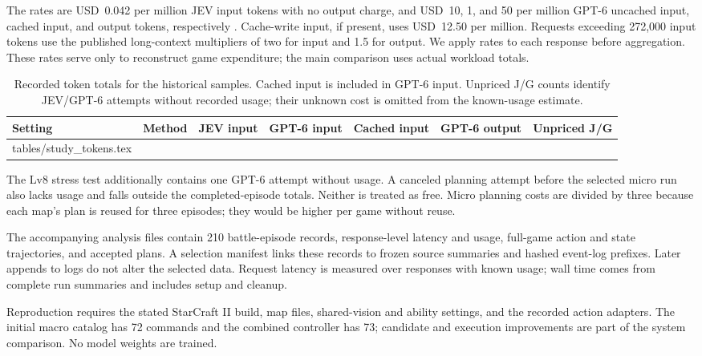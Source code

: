\documentclass{article}
\makeatletter
\newcommand{\tablerows}[1]{\@@input #1 }
\newcommand{\captionbelowtable}{\normalsize\setlength{\abovecaptionskip}{7pt}\setlength{\belowcaptionskip}{0pt}}
\makeatother
\begin{document}
The rates are USD~0.042 per million JEV input tokens with no output charge, and USD~10, 1, and 50 per million GPT-6 uncached input, cached input, and output tokens, respectively \citep{typesafe2026models,openai2026gpt6astra}. Cache-write input, if present, uses USD~12.50 per million. Requests exceeding 272,000 input tokens use the published long-context multipliers of two for input and 1.5 for output. We apply rates to each response before aggregation. These rates serve only to reconstruct game expenditure; the main comparison uses actual workload totals.

\begin{table}[h]
\centering\scriptsize
\setlength{\tabcolsep}{3.5pt}
\begin{tabular}{llrrrrr}
\toprule
Setting & Method & JEV input & GPT-6 input & Cached input & GPT-6 output & Unpriced J/G \\
\midrule
\tablerows{tables/study_tokens.tex}
\bottomrule
\end{tabular}
\captionbelowtable
\caption{Recorded token totals for the historical samples. Cached input is included in GPT-6 input. Unpriced J/G counts identify JEV/GPT-6 attempts without recorded usage; their unknown cost is omitted from the known-usage estimate.}
\label{tab:tokens}
\end{table}

The Lv8 stress test additionally contains one GPT-6 attempt without usage. A canceled planning attempt before the selected micro run also lacks usage and falls outside the completed-episode totals. Neither is treated as free. Micro planning costs are divided by three because each map's plan is reused for three episodes; they would be higher per game without reuse.

The accompanying analysis files contain 210 battle-episode records, response-level latency and usage, full-game action and state trajectories, and accepted plans. A selection manifest links these records to frozen source summaries and hashed event-log prefixes. Later appends to logs do not alter the selected data. Request latency is measured over responses with known usage; wall time comes from complete run summaries and includes setup and cleanup.

Reproduction requires the stated StarCraft II build, map files, shared-vision and ability settings, and the recorded action adapters. The initial macro catalog has 72 commands and the combined controller has 73; candidate and execution improvements are part of the system comparison. No model weights are trained.
\end{document}
